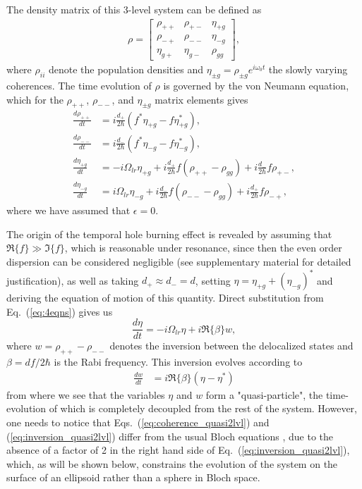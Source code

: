 \documentclass[reprint,secnumarabic,amssymb, nobibnotes, aip, prd]{revtex4-1}
\begin{document}
The density matrix of this 3-level system can be defined as 
\begin{align}
\rho = \begin{bmatrix}
\rho_{++} & \rho_{+-} & \eta_{+g} \\ 
\rho_{-+} & \rho_{--} & \eta_{-g} \\
\eta_{g+} & \eta_{g-} & \rho_{gg}
\end{bmatrix},
\end{align}
where $\rho_{ii}$ denote the population densities and $\eta_{\pm g} = \rho_{\pm g}e^{i\omega_0t}$ the slowly varying coherences. The time evolution of $\rho$ is governed by the von Neumann equation, which for the $\rho_{++}$, $\rho_{--}$, and $\eta_{\pm g}$ matrix elements gives  
\begin{subequations}
	\label{eq:4eqns}
	\begin{align}
	\frac{d \rho_{++}}{dt} &= i\frac{d_{+}}{2\hbar}(f^*\eta_{+g}-f\eta_{+g}^*), \\
	\frac{d \rho_{--}}{dt} &= i\frac{d_{-}}{2\hbar}(f^*\eta_{-g}-f\eta_{-g}^*), \\
	\frac{d \eta_{+g}}{dt} &= -i\Omega_{lr}\eta_{+g}+i\frac{d_{+}}{2\hbar}f(\rho_{++}-\rho_{gg})+i\frac{d_{-}}{2\hbar}f\rho_{+-}, \label{eq:eta+a}\\
	\frac{d \eta_{-g}}{dt} &= i\Omega_{lr}\eta_{-g}+i\frac{d_{-}}{2\hbar}f(\rho_{--}-\rho_{gg})+i\frac{d_{+}}{2\hbar}f\rho_{-+}, \label{eq:eta-a}
	\end{align}
\end{subequations}
where we have assumed that $\epsilon = 0$. 

The origin of the temporal hole burning effect is revealed by assuming that $\Re\{f\} \gg \Im\{f\} $, which is reasonable under resonance, since then the even order dispersion can be considered negligible\cite{khurgin2005optical} (see supplementary material for detailed justification), as well as taking $d_{+}\approx d_{-} = d$, setting  $\eta = \eta_{+g}+(\eta_{-g})^*$ and deriving the equation of motion of this quantity. Direct substitution from Eq.~(\ref{eq:4eqns}) gives us
\begin{equation}
\label{eq:coherence_quasi2lvl}
\frac{d \eta}{dt} = -i\Omega_{lr} \eta + i\Re\{\beta\}w, 
\end{equation}
where $w = \rho_{++}-\rho_{--}$ denotes the inversion between the delocalized states and $\beta =d f/2\hbar$ is the Rabi frequency. This inversion evolves according to 
\begin{align}
\label{eq:inversion_quasi2lvl}
\frac{d w }{dt}	&=  i\Re\{\beta\}(\eta-\eta^*)
\end{align}
from where we see that the variables $\eta$ and $w$ form a "quasi-particle", the time-evolution of which is completely decoupled from the rest of the system. However, one needs to notice that Eqs.~(\ref{eq:coherence_quasi2lvl}) and (\ref{eq:inversion_quasi2lvl}) differ from the usual Bloch equations \cite{boyd2003nonlinear}, due to the absence of a factor of 2 in the right hand side of Eq.~(\ref{eq:inversion_quasi2lvl}), which, as will be shown below, constrains the evolution of the system on the surface of an ellipsoid rather than a sphere in Bloch space.
\end{document}
